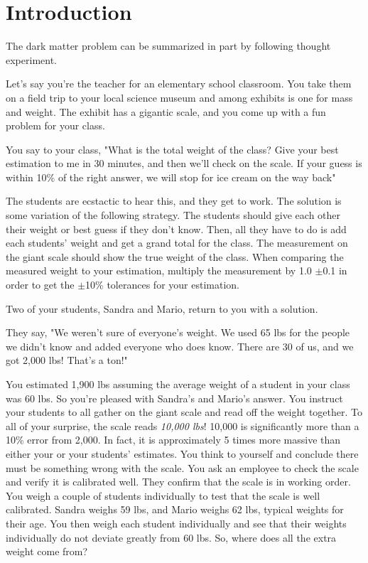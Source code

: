 \section{Introduction\label{sec:intro2dm}}

The dark matter problem can be summarized in part by following thought experiment.

Let's say you're the teacher for an elementary school classroom.
You take them on a field trip to your local science museum and among exhibits is one for mass and weight.
The exhibit has a gigantic scale, and you come up with a fun problem for your class.

You say to your class, "What is the total weight of the class?
Give your best estimation to me in 30 minutes, and then we'll check on the scale.
If your guess is within 10\% of the right answer, we will stop for ice cream on the way back"

The students are ecstactic to hear this, and they get to work.
The solution is some variation of the following strategy.
The students should give each other their weight or best guess if they don't know.
Then, all they have to do is add each students' weight and get a grand total for the class.
The measurement on the giant scale should show the true weight of the class.
When comparing the measured weight to your estimation, multiply the measurement by 1.0 $\pm$0.1 in order to get the $\pm$10\% tolerances for your estimation.

Two of your students, Sandra and Mario, return to you with a solution.

They say, "We weren't sure of everyone's weight.
We used 65 lbs for the people we didn't know and added everyone who does know.
There are 30 of us, and we got 2,000 lbs!
That's a ton!"

You estimated 1,900 lbs assuming the average weight of a student in your class was 60 lbs.
So you're pleased with Sandra's and Mario's answer.
You instruct your students to all gather on the giant scale and read off the weight together.
To all of your surprise, the scale reads \textit{10,000 lbs}!
10,000 is significantly more than a 10\% error from 2,000.
In fact, it is approximately 5 times more massive than either your or your students' estimates.
You think to yourself and conclude there must be something wrong with the scale.
You ask an employee to check the scale and verify it is calibrated well.
They confirm that the scale is in working order.
You weigh a couple of students individually to test that the scale is well calibrated.
Sandra weighs 59 lbs, and Mario weighs 62 lbs, typical weights for their age.
You then weigh each student individually and see that their weights individually do not deviate greatly from 60 lbs.
So, where does all the extra weight come from?

